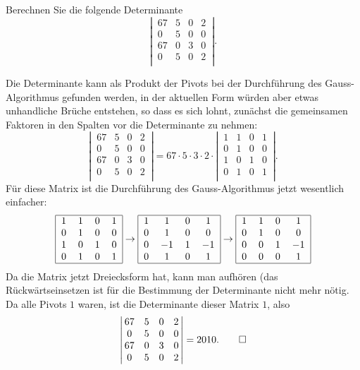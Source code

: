 Berechnen Sie die folgende Determinante
\[
\left|\,\begin{matrix}
67&5&0&2\\
0&5&0&0\\
67&0&3&0\\
0&5&0&2\\
\end{matrix}\,\right|.
\]


\begin{loesung}
Die Determinante kann als Produkt der Pivots bei der Durchführung des
Gauss-Algorithmus gefunden werden, in der aktuellen Form würden aber
etwas unhandliche Brüche entstehen, so dass es sich lohnt, zunächst
die gemeinsamen Faktoren in den Spalten vor die Determinante zu nehmen:
\[
\left|\,\begin{matrix}
67&5&0&2\\
0&5&0&0\\
67&0&3&0\\
0&5&0&2\\
\end{matrix}\,\right|
=
67\cdot5\cdot3\cdot 2\cdot
\left|\,\begin{matrix}
1&1&0&1\\
0&1&0&0\\
1&0&1&0\\
0&1&0&1\\
\end{matrix}\,\right|.
\]
Für diese Matrix ist die Durchführung des Gauss-Algorithmus jetzt
wesentlich einfacher:
\[
\begin{tabular}{|cccc|}
\hline
1&1&0&1\\
0&1&0&0\\
1&0&1&0\\
0&1&0&1\\
\hline
\end{tabular}
\rightarrow
\begin{tabular}{|cccc|}
\hline
1&1&0&1\\
0&1&0&0\\
0&$-1$&1&$-1$\\
0&1&0&1\\
\hline
\end{tabular}
\rightarrow
\begin{tabular}{|cccc|}
\hline
1&1&0&1\\
0&1&0&0\\
0&0&1&$-1$\\
0&0&0&1\\
\hline
\end{tabular}
\]
Da die Matrix jetzt Dreiecksform hat, kann man aufhören
(das Rückwärtseinsetzen ist für die Bestimmung der
Determinante nicht mehr nötig. Da alle Pivots $1$ waren, ist
die Determinante dieser Matrix $1$, also
\[
\left|\,\begin{matrix}
67&5&0&2\\
0&5&0&0\\
67&0&3&0\\
0&5&0&2\\
\end{matrix}\,\right|=2010.
\qedhere
\]
\end{loesung}


